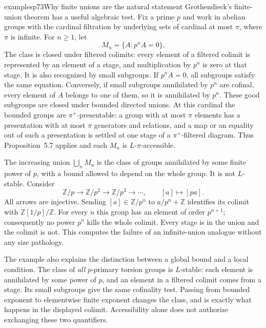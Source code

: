 \begin{dcomment}{examples}{p73}{Why finite unions are the natural statement}
Grothendieck's finite-union theorem has a useful algebraic test. Fix a prime $p$ and work in abelian groups with the cardinal filtration by underlying sets of cardinal at most $\pi$, where $\pi$ is infinite. For $n\geq1$, let
\[
 M_n=\{A:p^nA=0\}.
\]
The class is closed under filtered colimits: every element of a filtered colimit is represented by an element of a stage, and multiplication by $p^n$ is zero at that stage. It is also recognized by small subgroups. If $p^nA=0$, all subgroups satisfy the same equation. Conversely, if small subgroups annihilated by $p^n$ are cofinal, every element of $A$ belongs to one of them, so it is annihilated by $p^n$. These good subgroups are closed under bounded directed unions. At this cardinal the bounded groups are $\pi^+$-presentable: a group with at most $\pi$ elements has a presentation with at most $\pi$ generators and relations, and a map or an equality out of such a presentation is settled at one stage of a $\pi^+$-filtered diagram. Thus Proposition~5.7 applies and each $M_n$ is $L$-$\pi$-accessible.

The increasing union $\bigcup_nM_n$ is the class of groups annihilated by some finite power of $p$, with a bound allowed to depend on the whole group. It is not $L$-stable. Consider
\[
 \mathbb Z/p\longrightarrow\mathbb Z/p^2\longrightarrow
 \mathbb Z/p^3\longrightarrow\cdots,
 \qquad [a]\longmapsto[pa].
\]
All arrows are injective. Sending $[a]\in\mathbb Z/p^n$ to $a/p^n+\mathbb Z$ identifies its colimit with $\mathbb Z[1/p]/\mathbb Z$. For every $n$ this group has an element of order $p^{n+1}$; consequently no power $p^n$ kills the whole colimit. Every stage is in the union and the colimit is not. This computes the failure of an infinite-union analogue without any size pathology.

The example also explains the distinction between a global bound and a local condition. The class of \emph{all} $p$-primary torsion groups is $L$-stable: each element is annihilated by some power of $p$, and an element in a filtered colimit comes from a stage. Its small subgroups give the same cofinality test. Passing from bounded exponent to elementwise finite exponent changes the class, and is exactly what happens in the displayed colimit. Accessibility alone does not authorize exchanging these two quantifiers.
\end{dcomment}

